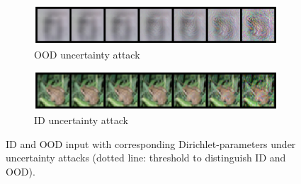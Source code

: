 \begin{figure}[ht!]
    \begin{subfigure}[t]{0.49 \columnwidth}
        \centering
        \includegraphics[width=0.99 \textwidth]{sections/008_icml2021/eval/ddnet_unc_ood_cifar10_images.png}
        \caption{OOD uncertainty attack
        }
        \label{fig:attaked_samples_idood_a}
    \end{subfigure}%
        \begin{subfigure}[t]{0.49 \columnwidth}
        \centering
        \includegraphics[width=0.99 \textwidth]{sections/008_icml2021/eval/ddnet_unc_id_cifar10_images.png}
        \caption{ID uncertainty attack
        }
        \label{fig:attaked_samples_idood_b}
    \end{subfigure}%
    \caption{ID and OOD input with corresponding Dirichlet-parameters under uncertainty attacks (dotted line: threshold to distinguish ID and OOD).}
    \label{fig:attaked_samples_idood}
\end{figure}




